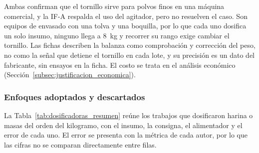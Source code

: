 Ambas confirman que el tornillo sirve para polvos finos en una máquina comercial,
y la IF-A respalda el uso del agitador, pero no resuelven el caso. Son equipos de
envasado con una tolva y una boquilla, por lo que cada uno dosifica un solo insumo,
ninguno llega a 8~kg y recorrer su rango exige cambiar el tornillo. Las fichas describen la
balanza como comprobación y corrección del peso, no como la señal que detiene el
tornillo en cada lote, y su precisión es un dato del fabricante, sin ensayos
en la ficha. El costo se trata en el análisis económico
(Sección~\ref{subsec:justificacion_economica}).

\subsubsection{Enfoques adoptados y descartados}
\label{subsec:dosificadoras_enfoques}

La Tabla~\ref{tab:dosificadoras_resumen} reúne los trabajos que dosificaron
harina o masas del orden del kilogramo, con el insumo, la consigna, el
alimentador y el error de cada uno. El error se presenta con la métrica de
cada autor, por lo que las cifras no se comparan directamente entre filas.

